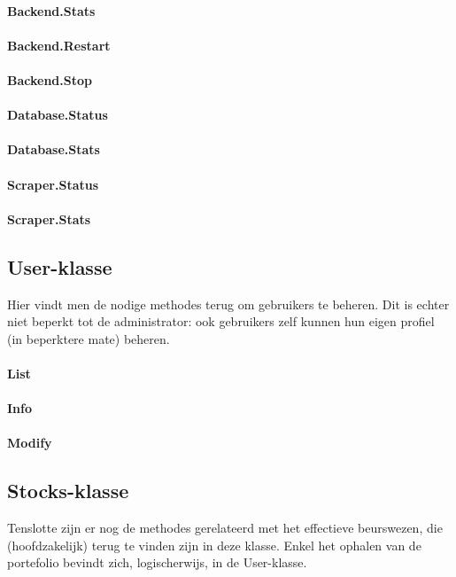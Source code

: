 \paragraph{Backend.Stats}

\paragraph{Backend.Restart}

\paragraph{Backend.Stop}

\paragraph{Database.Status}

\paragraph{Database.Stats}

\paragraph{Scraper.Status}

\paragraph{Scraper.Stats}


\subsection{User-klasse}

Hier vindt men de nodige methodes terug om gebruikers te beheren. Dit is echter niet beperkt tot de administrator: ook gebruikers zelf kunnen hun eigen profiel (in beperktere mate) beheren.

\paragraph{List}

\paragraph{Info}

\paragraph{Modify}


\subsection{Stocks-klasse}

Tenslotte zijn er nog de methodes gerelateerd met het effectieve beurswezen, die (hoofdzakelijk) terug te vinden zijn in deze klasse. Enkel het ophalen van de portefolio bevindt zich, logischerwijs, in de User-klasse.
